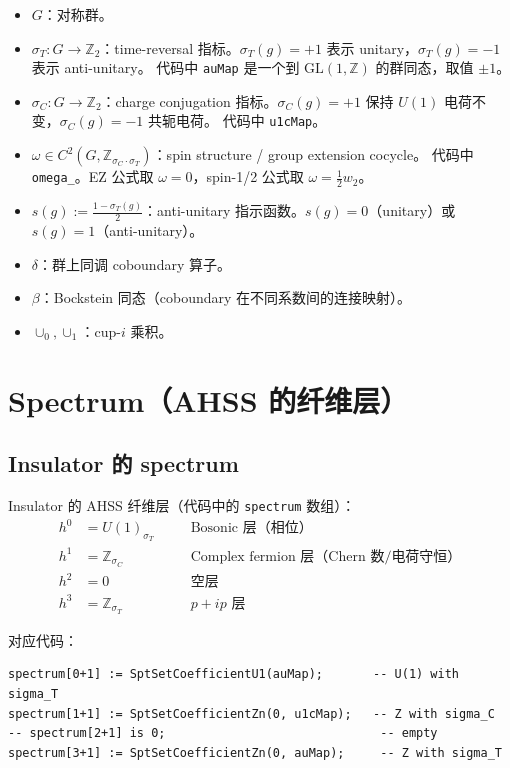 \documentclass[a4paper,fontset=ubuntu,12pt]{ctexart}
\newcommand{\ZZ}{\mathbb{Z}}
\newcommand{\aT}{\sigma_T}
\newcommand{\aC}{\sigma_C}
\begin{document}
\begin{itemize}
\item $G$：对称群。
\item $\aT: G \to \ZZ_2$：time-reversal 指标。$\aT(g) = +1$ 表示 unitary，$\aT(g) = -1$ 表示 anti-unitary。
      代码中 \texttt{auMap} 是一个到 $\mathrm{GL}(1, \ZZ)$ 的群同态，取值 $\pm 1$。
\item $\aC: G \to \ZZ_2$：charge conjugation 指标。$\aC(g) = +1$ 保持 $U(1)$ 电荷不变，$\aC(g) = -1$ 共轭电荷。
      代码中 \texttt{u1cMap}。
\item $\omega \in C^2(G, \ZZ_{\aC \cdot \aT})$：spin structure / group extension cocycle。
      代码中 \texttt{omega\_}。EZ 公式取 $\omega = 0$，spin-1/2 公式取 $\omega = \frac{1}{2} w_2$。
\item $s(g) := \frac{1 - \aT(g)}{2}$：anti-unitary 指示函数。$s(g) = 0$（unitary）或 $s(g) = 1$（anti-unitary）。
\item $\delta$：群上同调 coboundary 算子。
\item $\beta$：Bockstein 同态（coboundary 在不同系数间的连接映射）。
\item $\cup_0, \cup_1$：cup-$i$ 乘积。
\end{itemize}

\section{Spectrum（AHSS 的纤维层）}
\label{sec:spectrum}

\subsection{Insulator 的 spectrum}

Insulator 的 AHSS 纤维层（代码中的 \texttt{spectrum} 数组）：
\begin{equation}
\label{eq:insulator-spectrum}
\begin{aligned}
h^0 &= U(1)_{\aT}  &&\quad \text{Bosonic 层（相位）} \\
h^1 &= \ZZ_{\aC}    &&\quad \text{Complex fermion 层（Chern 数/电荷守恒）} \\
h^2 &= 0            &&\quad \text{空层} \\
h^3 &= \ZZ_{\aT}    &&\quad \text{$p+ip$ 层}
\end{aligned}
\end{equation}

对应代码：
\begin{lstlisting}
spectrum[0+1] := SptSetCoefficientU1(auMap);       -- U(1) with sigma_T
spectrum[1+1] := SptSetCoefficientZn(0, u1cMap);   -- Z with sigma_C
-- spectrum[2+1] is 0;                              -- empty
spectrum[3+1] := SptSetCoefficientZn(0, auMap);     -- Z with sigma_T
\end{lstlisting}
\end{document}
